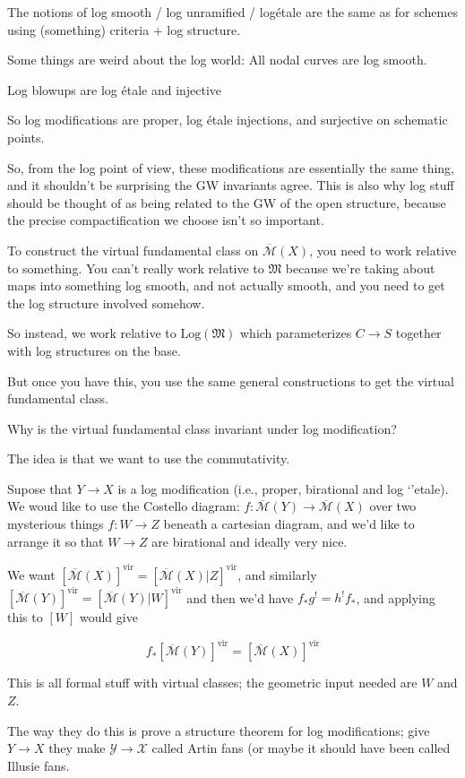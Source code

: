 \documentclass{amsart}
\theoremstyle{definition}
\newcommand{\Mbar}{\overline{\mathcal{M}}}
\newcommand{\vir}{\text{vir}}
\begin{document}
The notions of log smooth / log unramified / log\'etale are the same as for schemes using (something) criteria + log structure.


Some things are weird about the log world:
All nodal curves are log smooth.

Log blowups are log \'etale and injective

So log modifications are proper, log \'etale injections, and surjective on schematic points.

So, from the log point of view, these modifications are essentially the same thing, and it shouldn't be surprising the GW invariants agree.  This is also why log stuff should be thought of as being related to the GW of the open structure, because the precise compactification we choose isn't so important.

To construct the virtual fundamental class on $\Mbar(X)$, you need to work relative to something.  You can't really work relative to $\mathfrak{M}$ because we're taking about maps into something log smooth, and not actually smooth, and you need to get the log structure involved somehow.  

So instead, we work relative to $\text{Log}(\mathfrak{M})$ which parameterizes $C\to S$ together with log structures on the base.

But once you have this, you use the same general constructions to get the virtual fundamental class.

Why is the virtual fundamental class invariant under log modification?

The idea is that we want to use the commutativity.

Supose that $Y\to X$ is a log modification (i.e., proper, birational and log `'etale).  We woud like to use the Costello diagram:
$f:\Mbar(Y)\to \Mbar(X)$ over two mysterious things $f:W\to Z$ beneath a cartesian diagram, and we'd like to arrange it so that $W\to Z$ are birational and ideally very nice.

We want $[\Mbar(X)]^\vir=[\Mbar(X)|Z]^\vir$, and similarly $[\Mbar(Y)]^\vir=[\Mbar(Y)|W]^\vir$
and then we'd have $f_*g^!=h^!f_*$, and applying this to $[W]$ would give

$$f_*[\Mbar(Y)]^\vir=[\Mbar(X)]^\vir$$


This is all formal stuff with virtual classes; the geometric input needed are $W$ and $Z$.

The way they do this is prove a structure theorem for log modifications; give $Y\to X$ they make $\mathcal{Y}\to\mathcal{X}$ called Artin fans (or maybe it should have been called Illusie fans.
\end{document}
